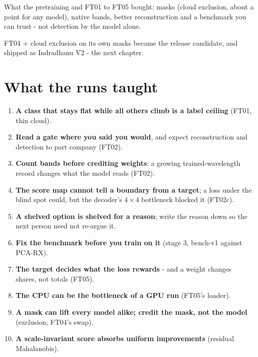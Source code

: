 \begin{keypoint}
What the pretraining and FT01 to FT05 bought: masks (cloud exclusion, about a point for any model), native bands,
better reconstruction and a benchmark you can trust - not detection by the model alone.
\end{keypoint}

FT04 + cloud exclusion on its own masks became the release candidate, and shipped as Indradhanu V2 - the next chapter.

\section{What the runs taught}\label{sec:ftruns:lessons}

\begin{enumerate}
\item \textbf{A class that stays flat while all others climb is a label ceiling} (FT01, thin cloud).
\item \textbf{Read a gate where you said you would}, and expect reconstruction and detection to part company (FT02).
\item \textbf{Count bands before crediting weights}: a growing trained-wavelength record changes what the model reads
  (FT02).
\item \textbf{The score map cannot tell a boundary from a target}; a loss under the blind spot could, but the decoder's
  $4 \times 4$ bottleneck blocked it (FT02c).
\item \textbf{A shelved option is shelved for a reason}; write the reason down so the next person need not re-argue it.
\item \textbf{Fix the benchmark before you train on it} (stage 3, bench-v1 against PCA-RX).
\item \textbf{The target decides what the loss rewards} - and a weight changes shares, not totals (FT05).
\item \textbf{The CPU can be the bottleneck of a GPU run} (FT05's loader).
\item \textbf{A mask can lift every model alike; credit the mask, not the model} (exclusion; FT04's swap).
\item \textbf{A scale-invariant score absorbs uniform improvements} (residual Mahalanobis).
\end{enumerate}

